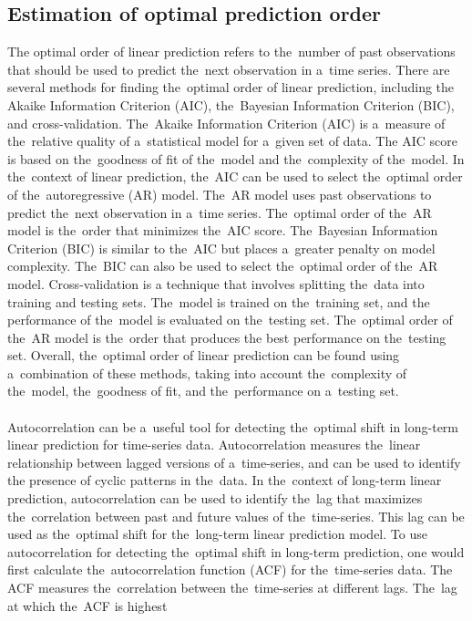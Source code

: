 \subsection{Estimation of optimal prediction order} \label{subsec:orderlp}
The optimal order of linear prediction refers to the~number of past observations that should be used to predict the~next
observation in a~time series. There are several methods for finding the~optimal order of linear prediction, including
the Akaike Information Criterion (AIC), the~Bayesian Information Criterion (BIC), and cross-validation. The~Akaike
Information Criterion (AIC) is a~measure of the~relative quality of a~statistical model for a~given set of data.
The AIC score is based on the~goodness of fit of the~model and the~complexity of the~model. In the~context of linear
prediction, the~AIC can be used to select the~optimal order of the~autoregressive (AR) model. The~AR model uses past
observations to predict the~next observation in a~time series. The~optimal order of the~AR model is the~order that
minimizes the~AIC score. The~Bayesian Information Criterion (BIC) is similar to the~AIC but places a~greater penalty
on model complexity. The~BIC can also be used to select the~optimal order of the~AR model. Cross-validation is a
technique that involves splitting the~data into training and testing sets. The~model is trained on the~training set, and
the performance of the~model is evaluated on the~testing set. The~optimal order of the~AR model is the~order that produces
the best performance on the~testing set. Overall, the~optimal order of linear prediction can be found using a~combination
of these methods, taking into account the~complexity of the~model, the~goodness of fit, and the~performance on a~testing set.\\
\\
Autocorrelation can be a~useful tool for detecting the~optimal shift in long-term linear prediction for time-series data.
Autocorrelation measures the~linear relationship between lagged versions of a~time-series, and can be used to identify
the presence of cyclic patterns in the~data. In the~context of long-term linear prediction, autocorrelation can be
used to identify the~lag that maximizes the~correlation between past and future values of the~time-series. This lag can
be used as the~optimal shift for the~long-term linear prediction model. To use autocorrelation for detecting the~optimal
shift in long-term prediction, one would first calculate the~autocorrelation function (ACF) for the~time-series data.
The ACF measures the~correlation between the~time-series at different lags. The~lag at which the~ACF is highest
